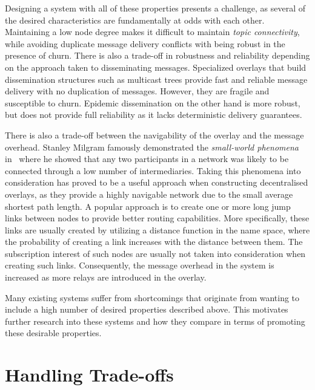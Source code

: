 Designing a system with all of these properties
presents a challenge, as several of the desired characteristics are
fundamentally at odds with each other. Maintaining a low node degree
makes it difficult to maintain \emph{topic connectivity}, while
avoiding duplicate message delivery conflicts with being robust in the
presence of churn. There is also a trade-off in robustness and
reliability depending on the approach taken to disseminating messages.
Specialized overlays that build dissemination structures such as
multicast trees provide fast and reliable message delivery with no
duplication of messages. However, they are fragile and susceptible to
churn. Epidemic dissemination on the other hand is more robust, but does
not provide full reliability as it lacks deterministic delivery
guarantees.

There is also a trade-off between the navigability of the overlay and
the message overhead. Stanley Milgram famously demonstrated the
\emph{small-world phenomena} in~\cite{milgram1967small} where he showed
that any two participants in a network was likely to be connected
through a low number of intermediaries. Taking this phenomena into
consideration has proved to be a useful approach when constructing
decentralised overlays, as they provide a highly navigable network due
to the small average shortest path length. A popular approach is to
create one or more long jump links between nodes to provide better
routing capabilities. More specifically, these links are usually created
by utilizing a distance function in the name space, where the
probability of creating a link increases with the distance between them.
The subscription interest of such nodes are usually not taken into
consideration when creating such links. Consequently, the message
overhead in the system is increased as more relays are introduced in the
overlay.

Many existing systems suffer from shortcomings that originate from wanting
to include a high number of desired properties described above. This
motivates further research into these systems and how they compare in
terms of promoting these desirable properties.

\section{Handling Trade-offs}

